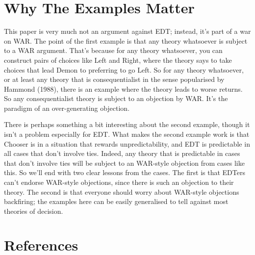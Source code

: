 \documentclass[
  12pt,
]{article}
\begin{document}
\hypertarget{why-the-examples-matter}{%
\section{Why The Examples Matter}\label{why-the-examples-matter}}

This paper is very much not an argument against EDT; instead, it's part of a war on WAR. The point of the first example is that any theory whatsoever is subject to a WAR argument. That's because for any theory whatsoever, you can construct pairs of choices like Left and Right, where the theory says to take choices that lead Demon to preferring to go Left. So for any theory whatsoever, or at least any theory that is consequentialist in the sense popularised by Hammond (1988), there is an example where the theory leads to worse returns. So any consequentialist theory is subject to an objection by WAR. It's the paradigm of an over-generating objection.

There is perhaps something a bit interesting about the second example, though it isn't a problem especially for EDT. What makes the second example work is that Chooser is in a situation that rewards unpredictability, and EDT is predictable in all cases that don't involve ties. Indeed, any theory that is predictable in cases that don't involve ties will be subject to an WAR-style objection from cases like this. So we'll end with two clear lessons from the cases. The first is that EDTers can't endorse WAR-style objections, since there is such an objection to their theory. The second is that everyone should worry about WAR-style objections backfiring; the examples here can be easily generalised to tell against most theories of decision.

\hypertarget{references}{%
\section*{References}\label{references}}
\end{document}
